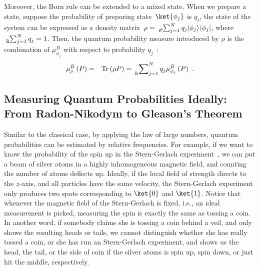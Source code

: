 \documentclass{article}
\theoremstyle{remark}
\newcommand{\proj}[1]{|#1 \rangle\langle #1 |}
\newcommand{\Tr}{\mathop{\mathrm{Tr}}\nolimits}
\begin{document}
Moreover, the Born rule can be extended to a mixed state. When we
prepare a state, suppose the probability of preparing state~$\ket{\phi_{j}}$
is $q_{j}$, the state of the system can be expressed as a density
matrix~$\rho=\tensor*[_{\mathscr{O}}]{\sum}{_{j=1}^{N}}q_{j}\proj{\phi_{j}}$,
where $\tensor*[_{\mathbb{R}}]{\sum}{_{j=1}^{N}}q_{j}=1$. Then, the
quantum probability measure introduced by $\rho$ is the combination
of $\mu_{\phi_{j}}^{B}$ with respect to probability $q_{j}$~\cite{peres1995quantum,544199,RiederSvozil2007}:
\begin{eqnarray}
\mu_{\rho}^{B}\left(P\right) & = & \Tr\left(\rho P\right)=\sideset{_{\mathbb{R}}}{_{j=1}^{N}}\sum q_{j}\mu_{\phi_{j}}^{B}\left(P\right)\textrm{ .}\label{BornRule.mixed}
\end{eqnarray}



\subsection{Measuring Quantum Probabilities Ideally: From Radon-Nikodym to Gleason's
Theorem}

Similar to the classical case, by applying the law of large numbers,
quantum probabilities can be estimated by relative frequencies. For
example, if we want to know the probability of the spin up in the
Stern-Gerlach experiment~\cite{Stern1988,peres1995quantum,544199,Griffiths2003},
we can put a beam of silver atoms in a highly inhomogeneous magnetic
field, and counting the number of atoms deflects up. Ideally, if the
local field of strength directs to the $z$-axis, and all particles
have the same velocity, the Stern-Gerlach experiment only produces
two spots corresponding to $\ket{0}$ and $\ket{1}$. Notice that
whenever the magnetic field of the Stern-Gerlach is fixed, i.e., an
ideal measurement is picked, measuring the spin is exactly the same
as tossing a coin. In another word, if somebody claims she is tossing
a coin behind a veil, and only shows the resulting heads or tails,
we cannot distinguish whether she has really tossed a coin, or she
has run an Stern-Gerlach experiment, and shows us the head, the tail,
or the side of coin if the silver atoms is spin up, spin down, or
just hit the middle, respectively.
\end{document}
